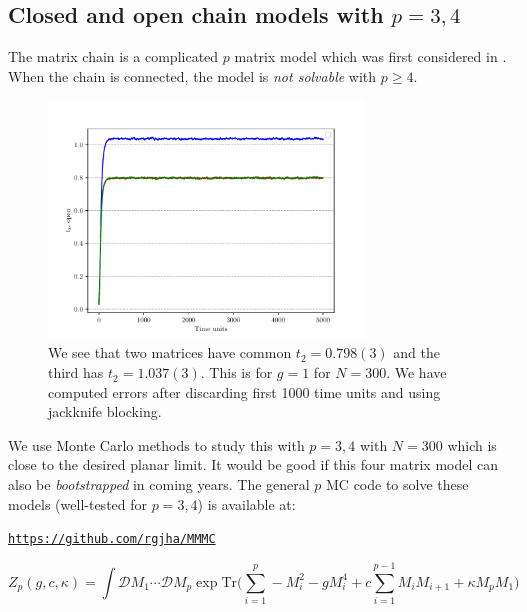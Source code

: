 \documentclass[11pt]{article}
\begin{document}
\subsection{\label{subsection:Mchain}Closed and open chain models with $p = 3, 4$}

The matrix chain is a complicated $p$ matrix model which was first 
considered in \cite{Chadha:1980ri}. When the chain is connected, the 
model is \emph{not solvable} with $p \ge 4$. 

\begin{figure}[htbp] 
	\centering 
	\includegraphics[width=0.75\textwidth]{figs/3MM_open.pdf}
	\caption{\label{fig:3MM_open}We see that two matrices have common $t_{2} = 0.798(3)$ and the third has 
	$t_{2} = 1.037(3)$. This is for $g=1$ for $N=300$. We have computed errors after discarding first 1000 time units and 
	using jackknife blocking.}
\end{figure}

We use Monte Carlo methods to study this with $p = 3,4$ with 
$N = 300$ which is close to the desired planar limit. 
It would be good if this four matrix model can 
also be \textit{bootstrapped} in coming years. 
The general $p$ MC code to solve these models 
(well-tested for $p = 3,4$) is available at: 

\begin{center} \texttt{\href{https://github.com/rgjha/MMMC}{https://github.com/rgjha/MMMC}} \end{center}

\begin{equation}
	\label{eq:Mehta1} 
	Z_{p}(g,c,\kappa) = \int \mathcal{D}M_{1} \cdots  \mathcal{D}M_{p} \exp \mbox{Tr} \Bigg(\sum_{i=1}^{p} -M_{i}^2  - g M_{i}^{4} + c \sum_{i=1}^{p-1} M_{i}M_{i+1} 
	+ \kappa M_{p}M_{1} \Bigg)
\end{equation}
\end{document}
